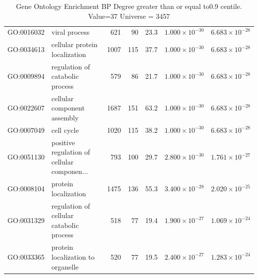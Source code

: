 \begin{table}[ht]
\begin{adjustbox}{max width=\textwidth}
\begin{tabular}{llrrrrr}
  GO:0016032 & viral process & 621 & 90 & 23.3 & $1.000 \times 10^{-30}$ & $6.683 \times 10^{-28}$ \\ 
  GO:0034613 & cellular protein localization & 1007 & 115 & 37.7 & $1.000 \times 10^{-30}$ & $6.683 \times 10^{-28}$ \\ 
  GO:0009894 & regulation of catabolic process & 579 & 86 & 21.7 & $1.000 \times 10^{-30}$ & $6.683 \times 10^{-28}$ \\ 
  GO:0022607 & cellular component assembly & 1687 & 151 & 63.2 & $1.000 \times 10^{-30}$ & $6.683 \times 10^{-28}$ \\ 
  GO:0007049 & cell cycle & 1020 & 115 & 38.2 & $1.000 \times 10^{-30}$ & $6.683 \times 10^{-28}$ \\ 
  GO:0051130 & positive regulation of cellular componen... & 793 & 100 & 29.7 & $2.800 \times 10^{-30}$ & $1.761 \times 10^{-27}$ \\ 
  GO:0008104 & protein localization & 1475 & 136 & 55.3 & $3.400 \times 10^{-28}$ & $2.020 \times 10^{-25}$ \\ 
  GO:0031329 & regulation of cellular catabolic process & 518 & 77 & 19.4 & $1.900 \times 10^{-27}$ & $1.069 \times 10^{-24}$ \\ 
  GO:0033365 & protein localization to organelle & 520 & 77 & 19.5 & $2.400 \times 10^{-27}$ & $1.283 \times 10^{-24}$ \\ 
   \hline
\end{tabular}
\end{adjustbox}
\caption{Gene Ontology Enrichment BP Degree  greater than or equal to0.9 centile.   Value=37 Universe = 3457} 
\label{tab:Gene Ontology Enrichment BP Degree  greater than or equal to0.9 centile.   Value=37 Universe = 3457}
\end{table}

